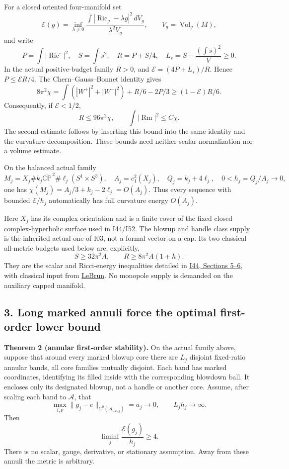 \documentclass[
  11pt,
]{article}
\begin{document}
For a closed oriented four-manifold set \[
 \mathcal E(g)=\inf_{\lambda\ne0}
   \frac{\int|\operatorname{Ric}_g-\lambda g|^2\,dV_g}{\lambda^2V_g},
 \qquad V_g=\operatorname{Vol}_g(M),
\] and write \[
 P=\int|\operatorname{Ric}^{\circ}|^2,\quad
 S=\int s^2,\quad R=P+S/4,\quad
 L_s=S-\frac{(\int s)^2}{V}\ge0 .
\] In the actual positive-budget family \(R>0\), and
\(\mathcal E=(4P+L_s)/R\). Hence \(P\le\mathcal E R/4\). The
Chern--Gauss--Bonnet identity gives \[
 8\pi^2\chi
 =\int(|W^+|^2+|W^-|^2)+R/6-2P/3
 \ge(1-\mathcal E)R/6.                               \tag{2.1}
\] Consequently, if \(\mathcal E<1/2\), \[
 R\le96\pi^2\chi,\qquad
                   \int|\operatorname{Rm}|^2\le C\chi. \tag{2.2}
\] The second estimate follows by inserting this bound into the same
identity and the curvature decomposition. These bounds need neither
scalar normalization nor a volume estimate.

On the balanced actual family \[
 M_j=X_j\# k_j\overline{\mathbb {CP}}^{\,2}
           \#\ell_j(S^1\times S^3),\quad
 A_j=c_1^2(X_j),\quad Q_j=k_j+4\ell_j,\quad 0<h_j=Q_j/A_j\to0,
\] one has \(\chi(M_j)=A_j/3+k_j-2\ell_j=O(A_j)\). Thus every sequence
with bounded \(\mathcal E/h_j\) automatically has full curvature energy
\(O(A_j)\).

Here \(X_j\) has its complex orientation and is a finite cover of the
fixed closed complex-hyperbolic surface used in I44/I52. The blowup and
handle class supply is the inherited actual one of I03, not a formal
vector on a cap. Its two classical all-metric budgets used below are,
explicitly, \[
             S\ge32\pi^2A,\qquad R\ge8\pi^2A(1+h).
\] They are the scalar and Ricci-energy inequalities detailed in
\href{20260927_covering_geometry_and_sharp_subfamilies.md}{I44, Sections
5--6}, with classical input from
\href{https://arxiv.org/html/math/0003068}{LeBrun}. No monopole supply
is demanded on the auxiliary capped manifold.

\hypertarget{long-marked-annuli-force-the-optimal-first-order-lower-bound}{%
\subsection{3. Long marked annuli force the optimal first-order lower
bound}\label{long-marked-annuli-force-the-optimal-first-order-lower-bound}}

\textbf{Theorem 2 (annular first-order stability).} On the actual family
above, suppose that around every marked blowup core there are \(L_j\)
disjoint fixed-ratio annular bands, all core families mutually disjoint.
Each band has marked coordinates, identifying its filled inside with the
corresponding blowdown ball. It encloses only its designated blowup, not
a handle or another core. Assume, after scaling each band to
\(\mathcal A\), that \[
 \max_{i,\nu}\|g_j-e\|_{C^0(\mathcal A_{i,\nu,j})}
          =a_j\longrightarrow0,\qquad
                         L_jh_j\longrightarrow\infty. \tag{3.1}
\] Then \[
                       \liminf_j\frac{\mathcal E(g_j)}{h_j}\ge4.
                                                               \tag{3.2}
\] There is no scalar, gauge, derivative, or stationary assumption. Away
from these annuli the metric is arbitrary.
\end{document}
